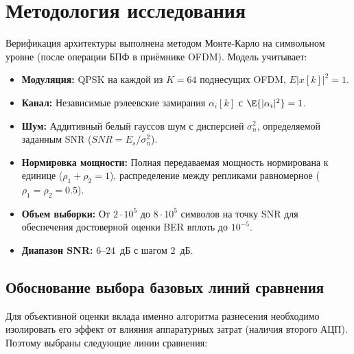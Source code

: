\documentclass[a4paper,12pt]{article}
\numberwithin{equation}{section}
\begin{document}
\section{Методология исследования}

Верификация архитектуры выполнена методом Монте-Карло на символьном уровне (после операции БПФ в приёмнике OFDM). Модель учитывает:
\begin{itemize}
    \item \textbf{Модуляция:} QPSK на каждой из $K=64$ поднесущих OFDM, $E|x[k]|^2=1$.
    \item \textbf{Канал:} Независимые рэлеевские замирания $\alpha_i[k]$ с $\E{|\alpha_i|^2}=1$.
    \item \textbf{Шум:} Аддитивный белый гауссов шум с дисперсией $\sigma_n^2$, определяемой заданным SNR ($SNR = E_s/\sigma_n^2$).
    \item \textbf{Нормировка мощности:} Полная передаваемая мощность нормирована к единице ($\rho_1 + \rho_2 = 1$), распределение между репликами равномерное ($\rho_1=\rho_2=0.5$).
    \item \textbf{Объем выборки:} От $2\cdot10^5$ до $8\cdot10^5$ символов на точку SNR для обеспечения достоверной оценки BER вплоть до $10^{-5}$.
    \item \textbf{Диапазон SNR:} $6$--$24$~дБ с шагом $2$~дБ.
\end{itemize}

\subsection{Обоснование выбора базовых линий сравнения}
Для объективной оценки вклада именно алгоритма разнесения необходимо изолировать его эффект от влияния аппаратурных затрат (наличия второго АЦП). Поэтому выбраны следующие линии сравнения:
\end{document}

